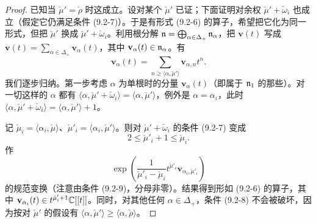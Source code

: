 \begin{proof}
已知当 $\check\mu'=\check\rho$ 时这成立。设对某个 $\check\mu'$ 已证；下面证明对余权 $\check\mu'+\check\omega_i$ 也成立（假定它仍满足条件 (9.2-7)）。于是有形式 (9.2-6) 的算子，希望把它化为同一形式，但把 $\check\mu'$ 换成 $\check\mu'+\check\omega_i$。利用根分解 $\mathfrak{n} = \bigoplus_{\alpha\in\Delta_+}\mathfrak{n}_\alpha$，把 $\mathbf{v}(t)$ 写成 $\mathbf{v}(t) = \sum_{\alpha\in\Delta_+}\mathbf{v}_\alpha(t)$，其中 $\mathbf{v}_\alpha(t)\in\mathfrak{n}_\alpha$。有
\begin{equation}
\mathbf{v}_\alpha(t) = \sum_{n\ge\langle\alpha,\check\mu'\rangle}\mathbf{v}_{\alpha,n}t^n.
\tag{9.2-8}
\end{equation}
我们逐步归纳。第一步考虑 $\alpha$ 为单根时的分量 $\mathbf{v}_\alpha(t)$（即属于 $\mathfrak{n}_1$ 的那些）。对一切这样的 $\alpha$ 都有 $\langle\alpha,\check\mu'+\check\omega_i\rangle = \langle\alpha,\check\mu'\rangle$，例外是 $\alpha=\alpha_i$，此时 $\langle\alpha,\check\mu'+\check\omega_i\rangle = \langle\alpha,\check\mu'\rangle+1$。

记 $\check\mu_i = \langle\alpha_i,\check\mu\rangle$、$\check\mu'_i = \langle\alpha_i,\check\mu'\rangle$。则对 $\check\mu'+\check\omega_i$ 的条件 (9.2-7) 变成
\begin{equation}
2\le\check\mu'_i+1\le\check\mu_i.
\tag{9.2-9}
\end{equation}
作
\[
\exp\left(\frac{1}{\check\mu'_i-\check\mu_i}t^{\check\mu'_i}\mathbf{v}_{\alpha_i,\check\mu'_i}\right)
\]
的规范变换（注意由条件 (9.2-9)，分母非零）。结果得到形如 (9.2-6) 的算子，其中 $\mathbf{v}_{\alpha_i}(t)\in t^{\check\mu'_i+1}\mathbb{C}[[t]]$。同时，对其他任何 $\alpha\in\Delta_+$，条件 (9.2-8) 不会被破坏，因为按对 $\check\mu'$ 的假设有 $\langle\alpha,\check\mu'\rangle\ge\langle\alpha,\check\rho\rangle$。


\end{proof}
